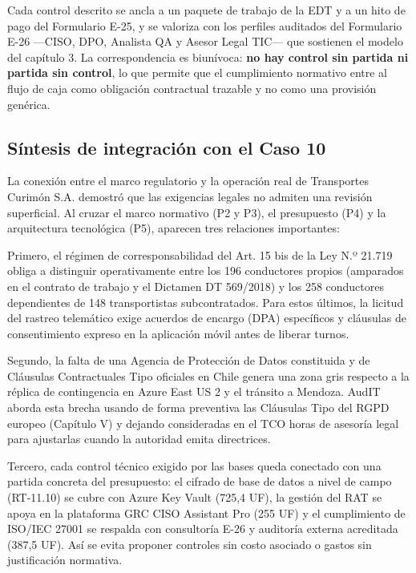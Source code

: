 Cada control descrito se ancla a un paquete de trabajo de la EDT y a un hito de pago del Formulario E-25, y se valoriza con los perfiles auditados del Formulario E-26 ---CISO, DPO, Analista QA y Asesor Legal TIC--- que sostienen el modelo del capítulo 3. La correspondencia es biunívoca: \textbf{no hay control sin partida ni partida sin control}, lo que permite que el cumplimiento normativo entre al flujo de caja como obligación contractual trazable y no como una provisión genérica.

\subsection{Síntesis de integración con el Caso 10}\label{suxedntesis-de-integraciuxf3n-con-el-caso-10}

La conexión entre el marco regulatorio y la operación real de Transportes Curimón S.A. demostró que las exigencias legales no admiten una revisión superficial. Al cruzar el marco normativo (P2 y P3), el presupuesto (P4) y la arquitectura tecnológica (P5), aparecen tres relaciones importantes:

Primero, el régimen de corresponsabilidad del Art. 15 bis de la Ley N.º 21.719 obliga a distinguir operativamente entre los 196 conductores propios (amparados en el contrato de trabajo y el Dictamen DT 569/2018) y los 258 conductores dependientes de 148 transportistas subcontratados. Para estos últimos, la licitud del rastreo telemático exige acuerdos de encargo (DPA) específicos y cláusulas de consentimiento expreso en la aplicación móvil antes de liberar turnos.

Segundo, la falta de una Agencia de Protección de Datos constituida y de Cláusulas Contractuales Tipo oficiales en Chile genera una zona gris respecto a la réplica de contingencia en Azure East US 2 y el tránsito a Mendoza. AudIT aborda esta brecha usando de forma preventiva las Cláusulas Tipo del RGPD europeo (Capítulo V) y dejando consideradas en el TCO horas de asesoría legal para ajustarlas cuando la autoridad emita directrices.

Tercero, cada control técnico exigido por las bases queda conectado con una partida concreta del presupuesto: el cifrado de base de datos a nivel de campo (RT-11.10) se cubre con Azure Key Vault (725,4 UF), la gestión del RAT se apoya en la plataforma GRC CISO Assistant Pro (255 UF) y el cumplimiento de ISO/IEC 27001 se respalda con consultoría E-26 y auditoría externa acreditada (387,5 UF). Así se evita proponer controles sin costo asociado o gastos sin justificación normativa.

